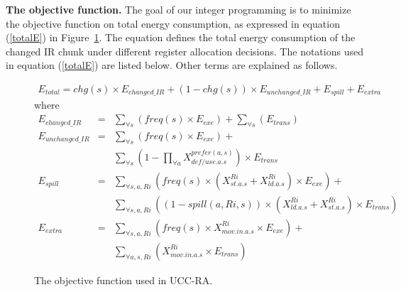 \textbf{The objective function.}
The goal of our integer programming is to minimize the objective
function on total energy consumption, as expressed in equation (\ref{totalE}) in
Figure~\ref{feqn}. The equation defines the total energy consumption of the
changed IR chunk under different register allocation decisions. The notations
used in equation ({\ref{totalE}}) are listed below.
Other terms are explained as follows.
\vspace{-0.1in}
\begin{figure}[htbp]
\begin{small}
\begin{eqnarray}
E_{total} = 
chg(s) \times E_{changed\_IR} + (1-chg(s))\times E_{unchanged\_IR} +
E_{spill} + E_{extra}  \label{totalE}
\end{eqnarray}
where
\vspace{-0.3in}
\begin{eqnarray}
E_{changed\_IR} &= &\sum_{\forall s} (freq(s) \times E_{exe}) +
\sum_{\forall s}(E_{trans})  \label{cE}\\
%
E_{unchanged\_IR} &= & \sum_{\forall s} (freq(s) \times E_{exe}) + \nonumber\\ 
									&  & \sum_{\forall s}(1-\prod_{\forall a}{X_{def/use.a.s}^{prefer(a,s)}}) \times 					E_{trans} \label{uE}\\
%
E_{spill} &=& \sum_{\forall s, a, Ri}
(freq(s) \times (X_{st.a.s}^{Ri}+X_{ld.a.s}^{Ri}) \times E_{exe}) + \nonumber\\
					& & \sum_{\forall s, a, Ri}( (1-spill(a,Ri,s)) \times
 (X_{ld.a.s}^{Ri}+X_{st.a.s}^{Ri}) \times E_{trans})  \\
E_{extra} &=& \sum_{\forall s, a, Ri}
(freq(s) \times X_{mov.in.a.s}^{Ri} \times E_{exe}) + \nonumber\\
					& &\sum_{\forall a, s, Ri} (X_{mov.in.a.s}^{Ri} \times E_{trans}) 
\end{eqnarray}
\end{small}
\vspace{-0.5in}
\caption{The objective function used in UCC-RA.}
\label{feqn}
\end{figure}


